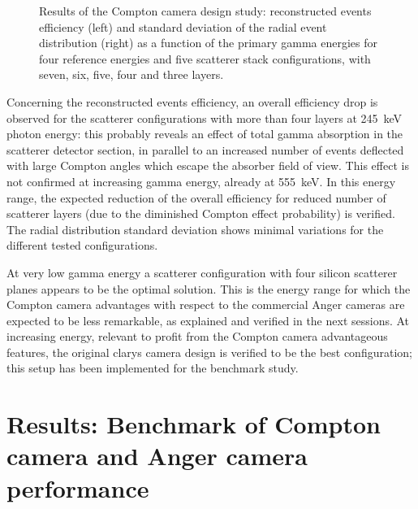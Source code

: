 \begin{figure}[h!]
\begin{subfigure}[t]{.5\textwidth}
 \label{chap5::fig::design_rms}
\end{subfigure}
\caption{Results of the Compton camera design study: reconstructed events efficiency (left) and standard deviation of the radial event distribution (right) as a function of the primary gamma energies for four reference energies and five scatterer stack configurations, with seven, six, five, four and three layers.}
\label{chap5::fig::design}
\end{figure} 

Concerning the reconstructed events efficiency, an overall efficiency drop is observed for the scatterer configurations with more than four layers at 245~keV photon energy: this probably reveals an effect of total gamma absorption in the scatterer detector section, in parallel to an increased number of events deflected with large Compton angles which escape the absorber field of view. This effect is not confirmed at increasing gamma energy, already at 555~keV. In this energy range, the expected reduction of the overall efficiency for reduced number of scatterer layers (due to the diminished Compton effect probability) is verified. The radial distribution standard deviation shows minimal variations for the different tested configurations.

At very low gamma energy a scatterer configuration with four silicon scatterer planes appears to be the optimal solution. This is the energy range for which the Compton camera advantages with respect to the commercial Anger cameras are expected to be less remarkable, as explained and verified in the next sessions. At increasing energy, relevant to profit from the Compton camera advantageous features, the original \gls{clarys} camera design is verified to be the best configuration; this setup has been implemented for the benchmark study.   


\section{Results: Benchmark of Compton camera and Anger camera performance}\label{chap5::sec::Results_benchmark}

